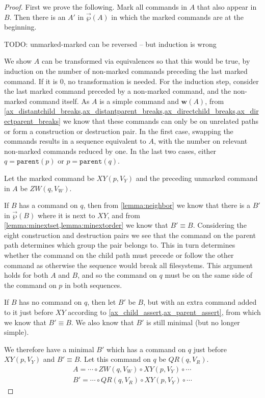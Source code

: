 \documentclass[12pt]{article}
\newcommand{\parent}{\mathtt{parent}}
\newcommand{\fscommand}[2]{{#1#2}}
\newcommand{\cxy}{\fscommand{X}{Y}}
\newcommand{\czw}{\fscommand{Z}{W}}
\newcommand{\cqr}{\fscommand{Q}{R}}
\newcommand{\cc}{\circ} %
\newcommand{\works}[1]{{\mathbf{w}}({#1})}
\newcommand{\orderset}[1]{\vec{\wp}({#1})}
\theoremstyle{definition}
\begin{document}
\begin{proof}
First we prove the following.
Mark all commands in $A$ that also appear in $B$.
Then there is an $A'$ in $\orderset{A}$ in which the marked commands are at the beginning.

\medskip

TODO: unmarked-marked can be reversed -- but induction is wrong

We show $A$ can be transformed via equivalences so that this would be true,
by induction on the number of non-marked commands preceding the last marked command.
If it is 0, no transformation is needed.
For the induction step, consider the last marked command preceded by a non-marked command,
and the non-marked command itself.
As $A$ is a simple command and $\works{A}$, from 
\cref{ax_distantchild_breaks,ax_distantparent_breaks,ax_directchild_breaks,ax_directparent_breaks}
we know that these commands can only be on unrelated paths or form a construction or destruction pair.
In the first case, swapping the commands results in a sequence equivalent to $A$,
with the number on relevant non-marked commands reduced by one.
In the last two cases,
either $q=\parent(p)$ or $p=\parent(q)$.

Let the marked command be $\cxy(p, V_Y)$ and the preceding unmarked command in $A$ be $\czw(q, V_W)$.

If $B$ has a command on $q$, then
from \cref{lemma:neighbor}
we know that there is a $B'$ in $\orderset{B}$ where it is next to $\cxy$,
and from \cref{lemma:minextset,lemma:minextorder} we know that $B'\equiv B$.
Considering the eight construction and destruction pairs we see that the command
on the parent path determines which group the pair belongs to.
This in turn determines whether the command on the child path must
precede or follow the other command as otherwise the sequence would break all filesystems.
This argument holds for both $A$ and $B$, and so the command on $q$ must be on
the same side of the command on $p$ in both sequences.

If $B$ has no command on $q$, then let $B'$ be $B$, but with an extra command added to it just before $\cxy$
according to \cref{ax_child_assert,ax_parent_assert}, from which we know
that $B'\equiv B$.
We also know that $B'$ is still minimal (but no longer simple).

We therefore have a minimal $B'$ which has a command on $q$ just before $\cxy(p, V_Y)$ and $B'\equiv B$.
Let this command on $q$ be $\cqr(q, V_R)$.
\begin{gather*}
A = \cdots\cc  \czw(q, V_W)\cc  \cxy(p, V_Y)\cc  \cdots \\
B' = \cdots\cc  \cqr(q, V_R)\cc  \cxy(p, V_Y)\cc  \cdots
\end{gather*}


\end{proof}
\end{document}
